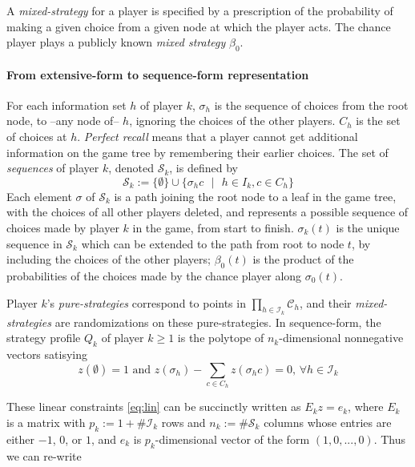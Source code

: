 \documentclass{article} %
\begin{document}
A \textit{mixed-strategy} for a player is specified by a prescription of the probability of making a given choice from a given node at which the player acts. The chance player plays a publicly known \textit{mixed strategy} $\beta_0$.

\paragraph{From extensive-form to sequence-form representation}
For each information set $h$ of player $k$, $\sigma_h$ is the sequence of choices from the root node, to --any node of-- $h$, ignoring the choices of the other players. $C_h$ is the set of choices at $h$. \textit{Perfect recall} means that a player cannot get additional information on the game tree by remembering their earlier choices. The set of \textit{sequences} of player $k$, denoted $\mathcal{S}_k$, is defined by 
\begin{equation}
\mathcal{S}_k := \{\emptyset\} \cup \{\sigma_h c\text{ } |\text{ } h \in I_k, c \in C_h\}
\end{equation}
Each element $\sigma$ of $\mathcal{S}_k$ is a path joining the root node to a leaf in the game tree, with the choices of all other players deleted, and represents a possible sequence of choices made by player $k$ in the game, from start to finish. $\sigma_k(t)$ is the unique sequence in $\mathcal{S}_k$ which can be extended to the path from root to node $t$, by including the choices of the other players;
$\beta_0(t)$ is the product of the probabilities of the choices made by the chance player along $\sigma_0(t)$.

Player $k$'s \textit{pure-strategies} correspond to points in $\prod_{h \in \mathcal{I}_k}{\mathcal{C}_h}$, and their \textit{mixed-strategies} are randomizations on these pure-strategies. In sequence-form, the strategy profile $Q_k$ of player $k \ge 1$ is the polytope of $n_k$-dimensional nonnegative vectors satisying
\begin{equation}
    z(\emptyset) = 1 \text{ and }
    z(\sigma_h) - \sum_{c \in C_h}{z(\sigma_h c)} = 0\text{, } \forall h \in \mathcal{I}_k
  \label{eq:lin}
\end{equation}

These linear constraints \eqref{eq:lin} can be succinctly written as $E_k z = e_k$,
where $E_k$ is a matrix with $p_k := 1 + \#\mathcal{I}_k$ rows and $n_k := \#\mathcal{S}_k$ columns whose entries are either $-1$, $0$, or $1$, and $e_k$ is $p_k$-dimensional vector of the form $(1, 0, ..., 0)$. Thus we can re-write
\end{document}
